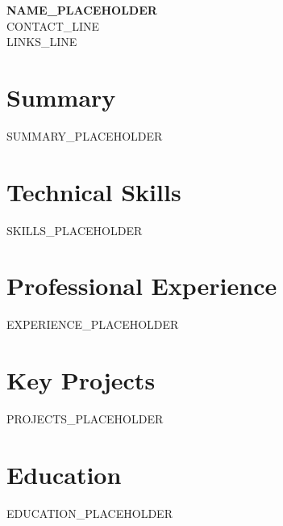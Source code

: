 \documentclass[10pt, a4paper]{article}
\begin{document}
\begin{center}
  {\LARGE \textbf{NAME_PLACEHOLDER}}\\[4pt]
  {{{CONTACT_LINE}}}\\[2pt]
  {{{LINKS_LINE}}}
\end{center}

\vspace{-2pt}

\section{Summary}
{{{SUMMARY_PLACEHOLDER}}}

\section{Technical Skills}
{{{SKILLS_PLACEHOLDER}}}

\section{Professional Experience}
{{{EXPERIENCE_PLACEHOLDER}}}

\section{Key Projects}
{{{PROJECTS_PLACEHOLDER}}}

\section{Education}
{{{EDUCATION_PLACEHOLDER}}}
\end{document}
